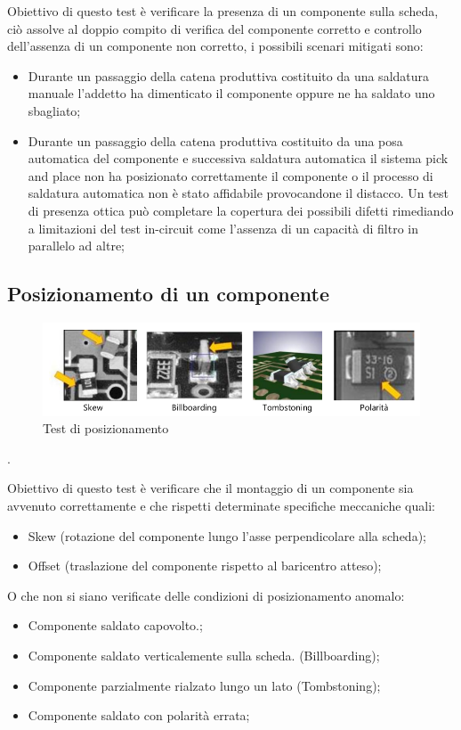 Obiettivo di questo test è verificare la presenza di un componente sulla scheda, ciò assolve al doppio
compito di verifica del componente corretto e controllo dell’assenza di un componente non corretto, i
possibili scenari mitigati sono:
\begin{itemize}
\item Durante un passaggio della catena produttiva costituito da una saldatura manuale l’addetto ha
dimenticato il componente oppure ne ha saldato uno sbagliato;
\item Durante un passaggio della catena produttiva costituito da una posa automatica del componente
e successiva saldatura automatica il sistema pick and place non ha posizionato correttamente il
componente o il processo di saldatura automatica non è stato affidabile provocandone il distacco.
Un test di presenza ottica può completare la copertura dei possibili difetti rimediando a limitazioni del
test in-circuit come l’assenza di un capacità di filtro in parallelo ad altre;
\end{itemize}

\subsection{Posizionamento di un componente}

\begin{figure}[!ht]
\centering
\includegraphics[width=.8\textwidth]{img/vari.png}
\caption{Test di posizionamento}
\label{fig:posizionamento}
\end{figure}.

Obiettivo di questo test è verificare che il montaggio di un componente sia avvenuto correttamente e che
rispetti determinate specifiche meccaniche quali:
\begin{itemize}
\item Skew (rotazione del componente lungo l’asse perpendicolare alla scheda);
\item Offset (traslazione del componente rispetto al baricentro atteso);
\end{itemize}

O che non si siano verificate delle condizioni di posizionamento anomalo:
\begin{itemize}
\item Componente saldato capovolto.;
\item Componente saldato verticalemente sulla scheda. (Billboarding);
\item Componente parzialmente rialzato lungo un lato (Tombstoning);
\item Componente saldato con polarità errata;
\end{itemize}

